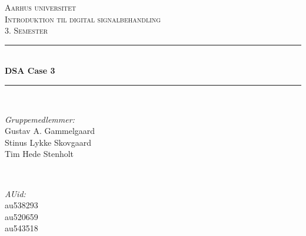 \documentclass[12pt]{article}
\begin{document}
\begin{titlepage}



\newcommand{\HRule}{\rule{\linewidth}{0.5mm}} %
\setlength{\topmargin}{0in}
\centering %

\textsc{\LARGE Aarhus universitet}\\[1.5cm] %
\textsc{\Large Introduktion til digital signalbehandling}\\[0.5cm] %
\textsc{\large 3. Semester}\\[0.5cm] %


\HRule \\[0.4cm]
{ \huge \bfseries DSA Case 3}\\ %
\HRule \\[1cm]
 

\begin{minipage}{0.4\textwidth}
	\begin{flushleft} \large
		\emph{Gruppemedlemmer:}\\
		Gustav A. Gammelgaard \\
		Stinus Lykke Skovgaard \\
		Tim Hede Stenholt \\ [0.5cm]
	\end{flushleft}
\end{minipage}
~
\begin{minipage}{0.4\textwidth}
	\begin{flushright} \large
		\emph{AUid:} \\
		au538293\\
		au520659\\
		au543518\\ [0.5cm]
	\end{flushright}
\end{minipage}\\[5cm]


\end{titlepage}
\end{document}
